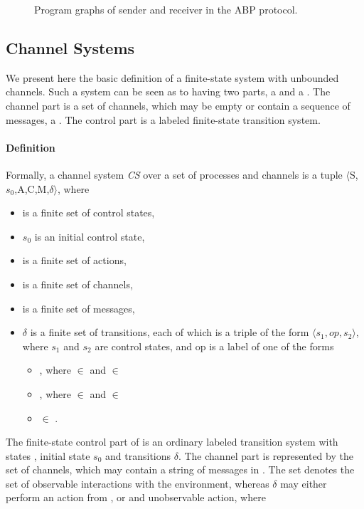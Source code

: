 \begin{figure}[h!]
\subfloat[Sender]{\label{fig:in1}
\abpsender{}
}
\subfloat[Receiver]{\label{fig:in2}
\abpreceiver{}
}
\caption{Program graphs of sender and receiver in the ABP protocol.}
\label{abpgraph}
\end{figure}

\subsection{Channel Systems}
We present here the basic definition of a finite-state system with unbounded channels. Such a system can be seen as to having two parts, a  and a . The channel part is a set of channels, which may be empty or contain a sequence of messages, a . The control part is a labeled finite-state transition system. 

\paragraph{Definition}
\label{CS}
Formally, a channel system \emph{CS} over a set of processes  and channels  is a tuple $\langle$S,$s_0$,A,C,M,$\delta$$\rangle$, where 
\begin{itemize}
\item[]
 is a finite set of control states,
\item[]
$s_0$ is an initial control state,
\item[]
 is a finite set of actions,
\item[]
 is a finite set of channels,
\item[]
 is a finite set of messages,
\item[]
$\delta$ is a finite set of transitions, each of which is a triple of the form $\langle s_1,op,s_2\rangle$, where $s_1$ and $s_2$ are control states, and op is a label of one of the forms

\begin{itemize}
\item
{}, where  $\in$  and  $\in$ 
\item
{}, where  $\in$  and  $\in$ 
\item
{} $\in$ .
\end{itemize}
\end{itemize}

The finite-state control part of  is an ordinary labeled transition system with states , initial state $s_0$ and transitions $\delta$. The channel part is represented by the set  of channels, which may contain a string of messages in . The set  denotes the set of observable interactions with the environment, whereas $\delta$ may either perform an action from , or and unobservable action, where

